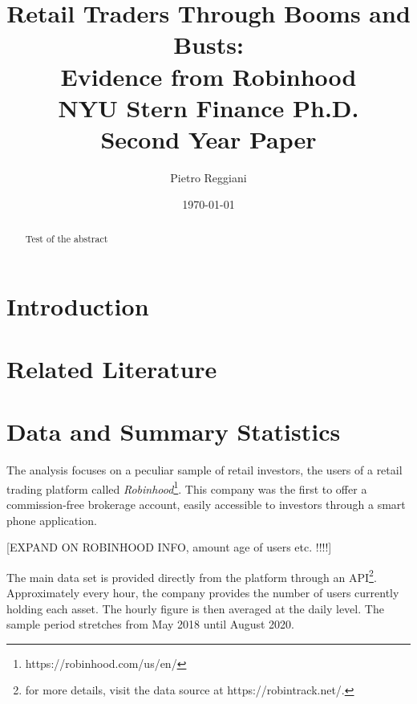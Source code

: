 \documentclass[12pt]{article}
\numberwithin{equation}{section} %
\begin{document}
 
 
\title{ Retail Traders Through Booms and Busts: \\ \vspace{1mm}
 Evidence from Robinhood \\ \vspace{7mm} \small NYU Stern Finance Ph.D. \\ Second Year Paper}
\author{Pietro Reggiani}
\date{\today}
 
\maketitle

\begin{abstract}
Test of the abstract
\end{abstract}

\newpage

\tableofcontents

\newpage


\section{Introduction}


\section{Related Literature}

\section{Data and Summary Statistics}

The analysis focuses on a peculiar sample of retail investors, the users of a retail trading platform called \textit{Robinhood}\footnote{https://robinhood.com/us/en/}. This company was the first to offer a commission-free brokerage account, easily accessible to investors through a smart phone application. 

[EXPAND ON ROBINHOOD INFO, amount age of users etc. !!!!]


The main data set is provided directly from the platform through an API\footnote{for more details, visit the data source at https://robintrack.net/.}. Approximately every hour, the company provides the number of users currently holding each asset. The hourly figure is then averaged at the daily level. The sample period stretches from May 2018 until August 2020.
\end{document}
